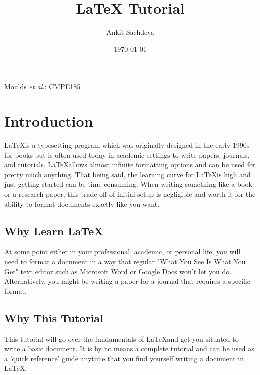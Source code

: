 \documentclass[12pt,journal,compsoc]{IEEEtran}
\begin{document}
\title{LaTeX Tutorial}
\author{Ankit Sachdeva}

\date{\today}		%

%
{Moulds \MakeLowercase{\textit{et al.}}: CMPE185}

\maketitle

\section{Introduction}

\IEEEPARstart {} \LaTeX \space is a typesetting program which was originally designed in the early 1990s for books but is often used today in academic settings to write papers, journals, and tutorials. \LaTeX \space allows almost infinite formatting options and can be used for pretty much anything. That being said, the learning curve for \LaTeX \space is high and just getting started can be time consuming. When writing something like a book or a research paper, this trade-off of initial setup is negligible and worth it for the ability to format documents exactly like you want. 

\subsection{Why Learn \LaTeX}
At some point either in your professional, academic, or personal life, you will need to format a document in a way that regular "What You See Is What You Get" text editor such as Microsoft Word or Google Docs won't let you do. Alternatively, you might be writing a paper for a journal that requires a specific format. 

\subsection{Why This Tutorial}
This tutorial will go over the fundamentals of \LaTeX \space and get you situated to write a basic document. It is by no means a complete tutorial and can be used as a 'quick reference' guide anytime that you find yourself writing a document in \LaTeX \space . 
\end{document}
